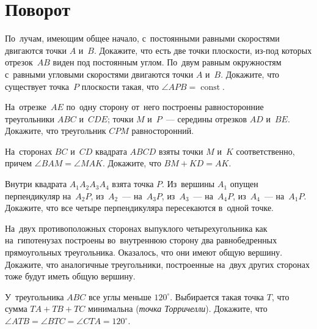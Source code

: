 
\section*{Поворот}


\begingroup
    \def\const{\operatorname{const}}

\begin{problems}

\item
\sp
По~лучам, имеющим общее начало, с~постоянными равными скоростями двигаются
точки $A$ и~$B$.
Докажите, что есть две точки плоскости, из-под которых отрезок~$AB$ виден под
постоянным углом.
\sp
По~двум равным окружностям с~равными угловыми скоростями двигаются
точки $A$ и~$B$.
Докажите, что существует точка~$P$ плоскости такая, что $\angle APB = \const$.

\item
На~отрезке~$AE$ по~одну сторону от~него построены равносторонние треугольники
$ABC$ и~$CDE$;
точки $M$ и~$P$~--- середины отрезков $AD$ и~$BE$.
Докажите, что треугольник $CPM$ равносторонний.

\item
На~сторонах $BC$ и~$CD$ квадрата $ABCD$ взяты точки $M$ и~$K$ соответственно,
причем $\angle BAM = \angle MAK$.
Докажите, что $BM + KD = AK$.

\item
Внутри квадрата $A_1 A_2 A_3 A_4$ взята точка $P$.
Из~вершины $A_1$ опущен перпендикуляр на~$A_2 P$, из~$A_2$~--- на~$A_3 P$,
из~$A_3$~--- на~$A_4 P$, из~$A_4$~--- на~$A_1 P$.
Докажите, что все четыре перпендикуляра пересекаются в~одной точке.

\item
На~двух противоположных сторонах выпуклого четырехугольника как на~гипотенузах
построены во~внутреннюю сторону два равнобедренных прямоугольных треугольника.
Оказалось, что они имеют общую вершину.
Докажите, что аналогичные треугольники, построенные на~двух других сторонах
тоже будут иметь общую вершину.

\item
У~треугольника $ABC$ все углы меньше $120^\circ$.
Выбирается такая точка $T$, что сумма $TA + TB + TC$ минимальна (\emph{точка
Торричелли}).
Докажите, что $\angle ATB = \angle BTC = \angle CTA = 120^\circ$.


\end{problems}
